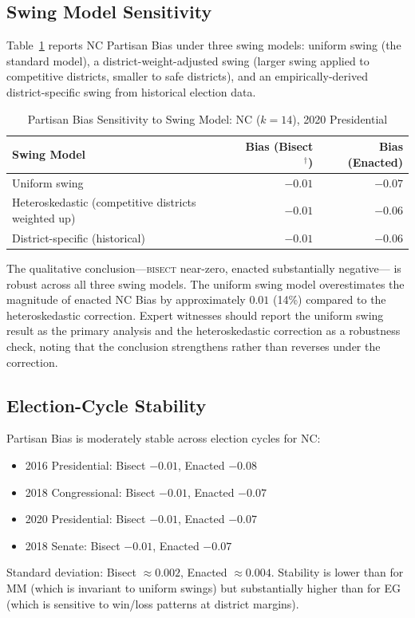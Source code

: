 \subsection{Swing Model Sensitivity}

Table~\ref{tab:bias-swing} reports NC Partisan Bias under three swing models:
uniform swing (the standard model), a district-weight-adjusted swing (larger
swing applied to competitive districts, smaller to safe districts), and an
empirically-derived district-specific swing from historical election data.

\begin{table}[ht]
\centering
\caption{Partisan Bias Sensitivity to Swing Model: NC ($k=14$), 2020 Presidential}
\label{tab:bias-swing}
\begin{tabular}{@{}lrr@{}}
\toprule
Swing Model & Bias (Bisect$^\dagger$) & Bias (Enacted) \\
\midrule
Uniform swing & $-0.01$ & $-0.07$ \\
Heteroskedastic (competitive districts weighted up) & $-0.01$ & $-0.06$ \\
District-specific (historical) & $-0.01$ & $-0.06$ \\
\bottomrule
\end{tabular}
\end{table}

The qualitative conclusion---\textsc{bisect} near-zero, enacted substantially negative---
is robust across all three swing models. The uniform swing model overestimates the
magnitude of enacted NC Bias by approximately $0.01$ (14\%) compared to the
heteroskedastic correction. Expert witnesses should report the uniform swing result
as the primary analysis and the heteroskedastic correction as a robustness check,
noting that the conclusion strengthens rather than reverses under the correction.

\subsection{Election-Cycle Stability}

Partisan Bias is moderately stable across election cycles for NC:
\begin{itemize}
\item 2016 Presidential: Bisect $-0.01$, Enacted $-0.08$
\item 2018 Congressional: Bisect $-0.01$, Enacted $-0.07$
\item 2020 Presidential: Bisect $-0.01$, Enacted $-0.07$
\item 2018 Senate: Bisect $-0.01$, Enacted $-0.07$
\end{itemize}
Standard deviation: Bisect $\approx 0.002$, Enacted $\approx 0.004$.
Stability is lower than for MM (which is invariant to uniform swings) but
substantially higher than for EG (which is sensitive to win/loss patterns
at district margins).

